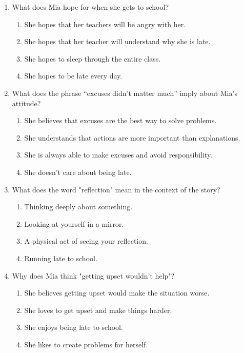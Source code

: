 \documentclass[12pt]{article}
\begin{document}
\begin{enumerate}
    \item What does Mia hope for when she gets to school?
    \begin{enumerate}[label=\Alph*.]
        \item She hopes that her teachers will be angry with her.
        \item She hopes that her teacher will understand why she is late.
        \item She hopes to sleep through the entire class.
        \item She hopes to be late every day.
    \end{enumerate}
    \vspace{0.5cm}

    \item What does the phrase “excuses didn’t matter much” imply about Mia’s attitude?
    \begin{enumerate}[label=\Alph*.]
        \item She believes that excuses are the best way to solve problems.
        \item She understands that actions are more important than explanations.
        \item She is always able to make excuses and avoid responsibility.
        \item She doesn’t care about being late.
    \end{enumerate}
    \vspace{0.5cm}

    \item What does the word "reflection" mean in the context of the story?
    \begin{enumerate}[label=\Alph*.]
        \item Thinking deeply about something.
        \item Looking at yourself in a mirror.
        \item A physical act of seeing your reflection.
        \item Running late to school.
    \end{enumerate}
    \vspace{0.5cm}

    \item Why does Mia think "getting upset wouldn’t help"?
    \begin{enumerate}[label=\Alph*.]
        \item She believes getting upset would make the situation worse.
        \item She loves to get upset and make things harder.
        \item She enjoys being late to school.
        \item She likes to create problems for herself.
    \end{enumerate}
    \vspace{0.5cm}


\end{enumerate}
\end{document}

